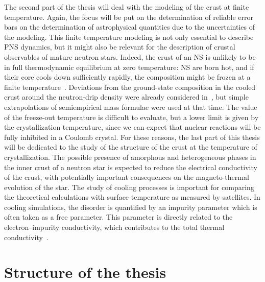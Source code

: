 The second part of the thesis will deal with the modeling of the crust at 
finite temperature. Again, the focus will be put on the determination of 
reliable error bars on the determination of astrophysical quantities due to the 
uncertainties of the modeling. This finite temperature modeling is not only 
essential to describe {PNS dynamics}, but it might also be 
relevant for the description of crustal observables of mature neutron stars. 
Indeed, the crust of an NS is unlikely to be in full thermodynamic equilibrium 
at zero temperature: NS are born hot, and if their core cools 
down sufficiently rapidly, the composition might be frozen at a finite 
temperature~\cite{Goriely2011}. 
Deviations from the ground-state composition in the cooled crust around the 
neutron-drip density were already considered in~\cite{Bisnovaty1979}, but 
simple extrapolations of semiempirical mass formulae were used at that time. 
The value of the freeze-out temperature is difficult to evaluate, but a lower 
limit is given by the crystallization temperature, since we can expect that 
nuclear reactions will be fully inhibited in a Coulomb crystal. 
For these reasons, the last part of this thesis will be dedicated to the study 
of the structure of the crust at the temperature of crystallization. 
The possible presence of amorphous and heterogeneous phases in the inner crust 
of a neutron star is expected to reduce the electrical conductivity of the 
crust, with potentially important consequences on the magneto-thermal evolution 
of the star. {The study of cooling processes is important for comparing 
  the theoretical calculations with surface temperature as measured by 
satellites.} In cooling simulations, the disorder is quantified by an impurity 
parameter which is often taken as a free parameter. {This parameter is 
  directly related to the electron--impurity conductivity, which contributes to 
the total thermal conductivity~\cite{Flowers1976}.}

\section*{Structure of the thesis}

